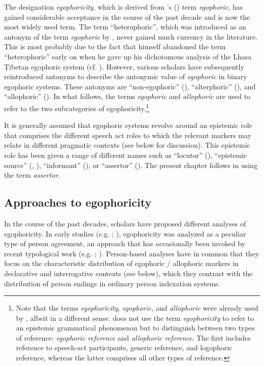 \documentclass[output=paper]{langsci/langscibook}
\begin{document}
The designation \emph{egophoricity}, which is derived from \citeauthor{Tournadre1991}’s (\citeyear{Tournadre1991}) term \emph{egophoric}, has gained considerable acceptance in the course of the past decade and is now the most widely used term. The term “heterophoric”, which was introduced as an antonym of the term \emph{egophoric} by \cite{Tournadre1991}, never gained much currency in the literature. This is most probably due to the fact that \citeauthor{Tournadre1991} himself abandoned the term “heterophoric” early on when he gave up his dichotomous analysis of the Lhasa Tibetan egophoric system (cf. \citealt[301, fn. 48]{Tournadre2008}). However, various scholars have subsequently reintroduced antonyms to describe the antonymic value of \emph{egophoric} in binary egophoric systems. These antonyms are “non-egophoric” (\citealt{SanRoque2018}), “alterphoric” (\citealt{Post2013}), and “allophoric” (\citealt{Widmer2017a}). In what follows, the terms \emph{egophoric} and \emph{allophoric} are used to refer to the two subcategories of egophoricity.\footnote{Note that the terms \emph{egophoricity}, \emph{egophoric}, and \emph{allophoric} were already used by \cite{Dahl2000}, albeit in a different sense. \citeauthor{Dahl2000} does not use the term \emph{egophoricity} to refer to an epistemic grammatical phenomenon but to distinguish between two types of reference: \emph{egophoric reference} and \emph{allophoric reference}. The first includes reference to speech-act participants, generic reference, and logophoric reference, whereas the latter comprises all other types of reference.}

It is generally assumed that egophoric systems revolve around an epistemic role that comprises the different speech act roles to which the relevant markers may relate in different pragmatic contexts (see below for discussion). This epistemic role has been given a range of different names such as “locutor” (\citealt{Curnow1997}), “epistemic source” (\citealt{Hargreaves1991}, \citealt{Hargreaves2005}), “informant” (\citealt{BickelNichols2007}), or “assertor” (\citealt{Creissels2008}). The present chapter follows \cite{Creissels2008} in using the term \emph{assertor}.

\subsection{Approaches to egophoricity}\label{s:mw2-2}

In the course of the past decades, scholars have proposed different analyses of egophoricity. In early studies (e.g. \citealt{HaleWatters1973}; \citealt{Hale1980}), egophoricity was analyzed as a peculiar type of person agreement, an approach that has occasionally been invoked by recent typological work (e.g. \citealt{Aikhenvald2004}; \citealt{BickelNichols2007}). Person-based analyses have in common that they focus on the characteristic distribution of egophoric / allophoric markers in declarative and interrogative contexts (see  below), which they contrast with the distribution of person endings in ordinary person indexation systems.
\end{document}
